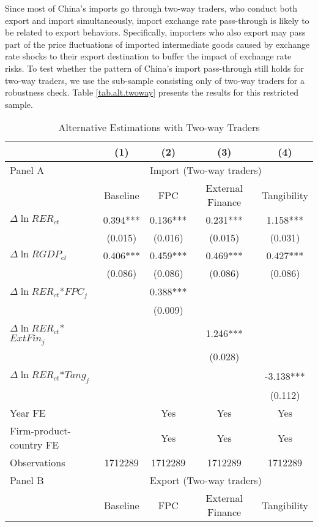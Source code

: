 \documentclass[12pt]{article}
\begin{document}
Since most of China's imports go through two-way traders, who conduct both export and import simultaneously, import exchange rate pass-through is likely to be related to export behaviors. Specifically, importers who also export may pass part of the price fluctuations of imported intermediate goods caused by exchange rate shocks to their export destination to buffer the impact of exchange rate risks. To test whether the pattern of China's import pass-through still holds for two-way traders, we use the sub-sample consisting only of two-way traders for a robustness check. Table \ref{tab.alt.twoway} presents the results for this restricted sample.

\begin{table}[htbp]
	\centering
	\caption{Alternative Estimations with Two-way Traders}
	\begin{threeparttable}
	\begin{tabular}{lcccc}
		\toprule
		& (1)   & (2)   & (3)   & (4) \\
		\midrule
		Panel A & \multicolumn{4}{c}{Import (Two-way traders)} \\
		& Baseline & FPC   & External Finance & Tangibility \\
		\midrule
		$\Delta \ln RER_{ct}$ & 0.394*** & 0.136*** & 0.231*** & 1.158*** \\
		& (0.015) & (0.016) & (0.015) & (0.031) \\
		$\Delta \ln RGDP_{ct}$ & 0.406*** & 0.459*** & 0.469*** & 0.427*** \\
		& (0.086) & (0.086) & (0.086) & (0.086) \\
		$\Delta \ln RER_{ct}$*$FPC_{j}$ &       & 0.388*** &       &  \\
		&       & (0.009) &       &  \\
		$\Delta \ln RER_{ct}$*$ExtFin_{j}$ &       &       & 1.246*** &  \\
		&       &       & (0.028) &  \\
		$\Delta \ln RER_{ct}$*$Tang_{j}$ &       &       &       & -3.138*** \\
		&       &       &       & (0.112) \\
		Year FE  &       & Yes   & Yes   & Yes \\
		Firm-product-country FE &       & Yes   & Yes   & Yes \\
		Observations & 1712289 & 1712289 & 1712289 & 1712289 \\
		\midrule
		Panel B & \multicolumn{4}{c}{Export (Two-way traders)} \\
		& Baseline & FPC   & External Finance & Tangibility \\

\end{tabular}
\end{threeparttable}
\end{table}
\end{document}
